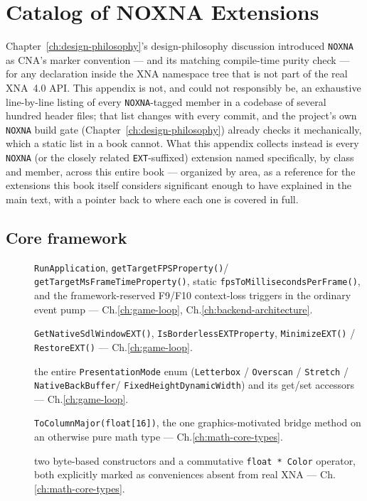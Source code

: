 \chapter{Catalog of NOXNA Extensions}
\label{ch:noxna-catalog}

Chapter~\ref{ch:design-philosophy}'s design-philosophy discussion introduced \texttt{NOXNA} as CNA's marker
convention --- and its matching compile-time purity check --- for any declaration inside the
XNA namespace tree that is not part of the real XNA~4.0 API. This appendix is not, and could
not responsibly be, an exhaustive line-by-line listing of every \texttt{NOXNA}-tagged member
in a codebase of several hundred header files; that list changes with every commit, and the
project's own \texttt{NOXNA} build gate (Chapter~\ref{ch:design-philosophy}) already checks it mechanically, which a
static list in a book cannot. What this appendix collects instead is every \texttt{NOXNA} (or
the closely related \texttt{EXT}-suffixed) extension named specifically, by class and member,
across this entire book --- organized by area, as a reference for the extensions this book
itself considers significant enough to have explained in the main text, with a pointer back
to where each one is covered in full.

\section{Core framework}

\begin{description}
\item[] \texttt{RunApplication},
  \texttt{getTargetFPS\allowbreak{}Property()}/%
  \texttt{getTargetMsFrameTime\allowbreak{}Property()}, static
  \texttt{fpsToMilliseconds\allowbreak{}PerFrame()}, and the framework-reserved F9/F10
  context-loss triggers in the ordinary event pump --- Ch.\ref{ch:game-loop}, Ch.\ref{ch:backend-architecture}.
\item[] \texttt{GetNativeSdlWindowEXT()}, \texttt{IsBorderlessEXTProperty},
  \texttt{MinimizeEXT()} / \texttt{RestoreEXT()} --- Ch.\ref{ch:game-loop}.
\item[] the entire \texttt{PresentationMode} enum
  (\texttt{Letterbox} / \texttt{Overscan} / \texttt{Stretch} / \texttt{NativeBackBuffer}/%
  \texttt{FixedHeightDynamicWidth}) and its get/set accessors --- Ch.\ref{ch:game-loop}.
\item[] \texttt{ToColumnMajor(float[16])}, the one graphics-motivated bridge
  method on an otherwise pure math type --- Ch.\ref{ch:math-core-types}.
\item[] two byte-based constructors and a commutative \texttt{float * Color}
  operator, both explicitly marked as conveniences absent from real XNA --- Ch.\ref{ch:math-core-types}.
\end{description}

